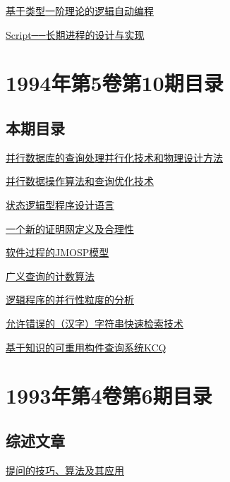 \documentclass[a4paper]{article}
\begin{document}
\href{http://www.jos.org.cn/ch/reader/download_pdf.aspx?file_no=19941108&year_id=1994&quarter_id=11&falg=1}{基于类型一阶理论的逻辑自动编程}

\href{http://www.jos.org.cn/ch/reader/download_pdf.aspx?file_no=19941109&year_id=1994&quarter_id=11&falg=1}{Script──长期进程的设计与实现}


\section{\textbf{1994年第5卷第10期目录}}
\subsection{本期目录}
\href{http://www.jos.org.cn/ch/reader/download_pdf.aspx?file_no=19941001&year_id=1994&quarter_id=10&falg=1}{并行数据库的查询处理并行化技术和物理设计方法}

\href{http://www.jos.org.cn/ch/reader/download_pdf.aspx?file_no=19941002&year_id=1994&quarter_id=10&falg=1}{并行数据操作算法和查询优化技术}

\href{http://www.jos.org.cn/ch/reader/download_pdf.aspx?file_no=19941003&year_id=1994&quarter_id=10&falg=1}{状态逻辑型程序设计语言}

\href{http://www.jos.org.cn/ch/reader/download_pdf.aspx?file_no=19941004&year_id=1994&quarter_id=10&falg=1}{一个新的证明网定义及合理性}

\href{http://www.jos.org.cn/ch/reader/download_pdf.aspx?file_no=19941005&year_id=1994&quarter_id=10&falg=1}{软件过程的JMOSP模型}

\href{http://www.jos.org.cn/ch/reader/download_pdf.aspx?file_no=19941006&year_id=1994&quarter_id=10&falg=1}{广义查询的计数算法}

\href{http://www.jos.org.cn/ch/reader/download_pdf.aspx?file_no=19941007&year_id=1994&quarter_id=10&falg=1}{逻辑程序的并行性粒度的分析}

\href{http://www.jos.org.cn/ch/reader/download_pdf.aspx?file_no=19941008&year_id=1994&quarter_id=10&falg=1}{允许错误的（汉字）字符串快速检索技术}

\href{http://www.jos.org.cn/ch/reader/download_pdf.aspx?file_no=19941009&year_id=1994&quarter_id=10&falg=1}{基于知识的可重用构件查询系统KCQ}


\section{\textbf{1993年第4卷第6期目录}}
\subsection{综述文章}
\href{http://www.jos.org.cn/ch/reader/download_pdf.aspx?file_no=19930602&year_id=1993&quarter_id=6&falg=1}{提问的技巧、算法及其应用}
\end{document}
